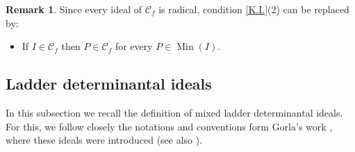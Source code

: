 \documentclass[12pt]{amsart}
\theoremstyle{definition}
\newtheorem{remark}[remark]{Remark}
\renewcommand{\(}{\left(}
\renewcommand{\)}{\right)}
\newcommand{\kk}{\mathbb{k}}
\renewcommand{\!}[1]{{\color{red}\text{\Huge$\star$ }#1}}
\newcommand{\MIN}{\operatorname{Min}}
\begin{document}
\begin{remark}
	Since every ideal of $\mathcal{C}_f$ is radical,  condition   \autoref{K.I.}(2) can be replaced by:
	\begin{itemize}
		\item[$(2^\prime)$] If $I \in \mathcal{C}_f$ then $P \in \mathcal{C}_f$ for every $P \in \MIN(I)$.
	\end{itemize}
\end{remark}



\subsection{Ladder determinantal ideals}\label{sub_ladder}


In this subsection we recall  the definition of mixed ladder determinantal ideals. For this, we follow closely the notations and conventions form Gorla's work \cite{GorlaMixed}, where these ideals were introduced    (see also \cite{gonciulea2000mixed}).
\end{document}
